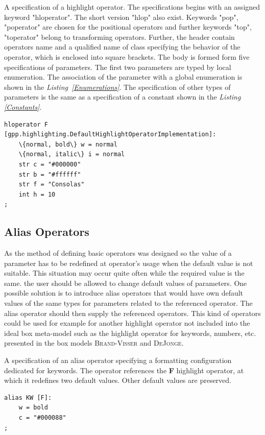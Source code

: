 \documentclass[12pt,notitlepage,a4paper]{report}
\begin{document}
\begin{expl}\label{BasicOperator}
A specification of a highlight operator. The specifications begins with an assigned keyword "hloperator". The short version "hlop" also exist.  Keywords "pop", "poperator" are chosen for the positional operators and further keywords "top", "toperator" belong to transforming operators. Further, the header contain operators name and a qualified name of class specifying the behavior of the operator, which is enclosed into square brackets. The body is formed form five specifications of parameters. The first two parameters are typed by local enumeration. The association of the parameter with a global enumeration is shown in the \textit{Listing~\ref{Enumerations}}.  The specification of other types of parameters is the same as a specification of a constant shown in the \textit{Listing \ref{Constants}}.
\begingroup
\fontsize{10pt}{12pt}
\begin{Verbatim}[commandchars=\\\{\}]
hloperator F [gpp.highlighting.DefaultHighlightOperatorImplementation]:
    \{normal, bold\} w = normal
    \{normal, italic\} i = normal
    str c = "#000000"
    str b = "#ffffff"
    str f = "Consolas"
    int h = 10
;
\end{Verbatim}
\endgroup
\end{expl}

\subsection{Alias Operators}

As the method of defining basic operators was designed so the value of a parameter has to be redefined at operator's usage when the default value is not suitable. This situation may occur quite often while the required value is the same.  the user should be allowed to change default values of parameters. One possible solution is to introduce alias operators that would have own default values of the same types for parameters related to the referenced operator. The alias operator should then supply the referenced operators. This kind of operators  could be used for example for another highlight operator not included into the ideal box meta-model such as the highlight operator for keywords, numbers, etc. presented in the box models \textsc{Brand-Visser} and \textsc{DeJonge}. 

\begin{expl}\label{AliasOperator}
A specification of an alias operator specifying a formatting configuration dedicated for keywords. The operator references the \textbf{F} highlight operator, at which it redefines two default values. Other default values are preserved.
\begingroup
\fontsize{10pt}{12pt}
\begin{Verbatim}[commandchars=\\\{\}]
alias KW [F]:
    w = bold
    c = "#000088"
;
\end{Verbatim}
\endgroup
\end{expl}
\end{document}
